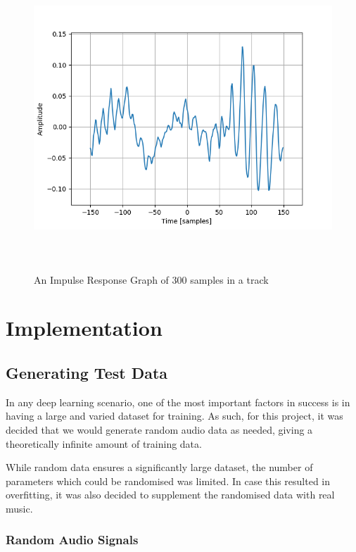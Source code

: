 \documentclass{l4proj}
\begin{document}
\begin{figure}
\centering
\includegraphics[width=6.00000in,height=4.50000in]{images/impulse.png}
\caption{An Impulse Response Graph of 300 samples in a
track\label{fig:impulse}}
\end{figure}

\chapter{Implementation}\label{implementation}

\section{Generating Test Data}\label{generating-test-data}

In any deep learning scenario, one of the most important factors in
success is in having a large and varied dataset for training. As such,
for this project, it was decided that we would generate random audio
data as needed, giving a theoretically infinite amount of training data.

While random data ensures a significantly large dataset, the number of
parameters which could be randomised was limited. In case this resulted
in overfitting, it was also decided to supplement the randomised data
with real music.

\subsection{Random Audio Signals}\label{random-audio-signals}
\end{document}
